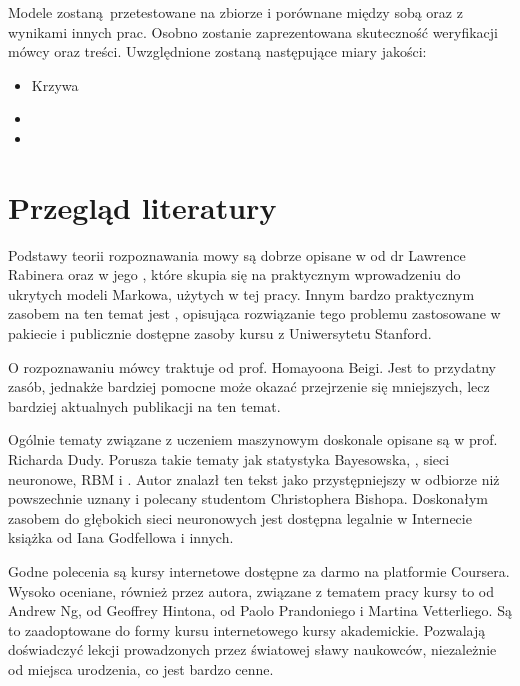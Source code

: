 Modele zostaną przetestowane na zbiorze  i porównane między sobą oraz z wynikami innych prac.
Osobno zostanie zaprezentowana skuteczność weryfikacji mówcy oraz treści. Uwzględnione zostaną następujące miary jakości:

\begin{itemize}
    \item Krzywa 
    \item {}
    \item {}
\end{itemize}

\section{Przegląd literatury}\label{sec:przeglad_literatury}

Podstawy teorii rozpoznawania mowy są dobrze opisane w \cite{fundamentalsOfSpeech}
od dr Lawrence Rabinera oraz w jego
\cite{aTutorialOnHidden}, które
skupia się na praktycznym wprowadzeniu do ukrytych modeli Markowa, użytych w tej pracy.
Innym bardzo praktycznym zasobem na ten temat jest \cite{theHtkBook}, opisująca rozwiązanie
tego problemu zastosowane w pakiecie  i publicznie dostępne zasoby
kursu  z Uniwersytetu Stanford.

O rozpoznawaniu mówcy traktuje  od prof. Homayoona Beigi.
Jest to przydatny zasób, jednakże bardziej pomocne może okazać przejrzenie się mniejszych, lecz
bardziej aktualnych publikacji na ten temat.

Ogólnie tematy związane z uczeniem maszynowym doskonale opisane są w
\cite{patternClassification} prof. Richarda Dudy.
Porusza takie tematy jak statystyka Bayesowska, , sieci neuronowe, RBM
i . Autor znalazł ten tekst jako przystępniejszy w odbiorze niż powszechnie
uznany i polecany studentom  Christophera Bishopa.
Doskonałym zasobem do głębokich sieci neuronowych jest dostępna legalnie w Internecie książka
\cite{deeplearningbook} od Iana Godfellowa i innych.

Godne polecenia są kursy internetowe dostępne za darmo na platformie Coursera.
Wysoko oceniane, również przez autora, związane z tematem pracy kursy to
 od Andrew Ng,
 od Geoffrey Hintona,
 od Paolo Prandoniego i  Martina Vetterliego.
Są to zaadoptowane do formy kursu internetowego kursy akademickie. Pozwalają
doświadczyć lekcji prowadzonych przez światowej sławy naukowców, niezależnie
od miejsca urodzenia, co jest bardzo cenne.

